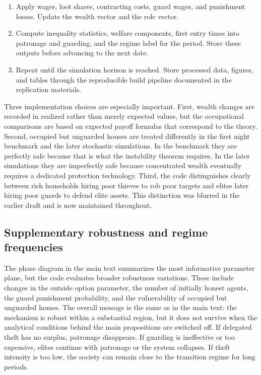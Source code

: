\begin{enumerate}[leftmargin=1.5em]
    \item Apply wages, loot shares, contracting costs, guard wages, and punishment losses. Update the wealth vector and the role vector.
    \item Compute inequality statistics, welfare components, first entry times into patronage and guarding, and the regime label for the period. Store these outputs before advancing to the next date.
    \item Repeat until the simulation horizon is reached. Store processed data, figures, and tables through the reproducible build pipeline documented in the replication materials.
\end{enumerate}

Three implementation choices are especially important. First, wealth changes are recorded in realized rather than merely expected values, but the occupational comparisons are based on expected payoff formulas that correspond to the theory. Second, occupied but unguarded houses are treated differently in the first night benchmark and the later stochastic simulations. In the benchmark they are perfectly safe because that is what the instability theorem requires. In the later simulations they are imperfectly safe because concentrated wealth eventually requires a dedicated protection technology. Third, the code distinguishes clearly between rich households hiring poor thieves to rob poor targets and elites later hiring poor guards to defend elite assets. This distinction was blurred in the earlier draft and is now maintained throughout.

\subsection{Supplementary robustness and regime frequencies}

The phase diagram in the main text summarizes the most informative parameter plane, but the code evaluates broader robustness variations. These include changes in the outside option parameter, the number of initially honest agents, the guard punishment probability, and the vulnerability of occupied but unguarded homes. The overall message is the same as in the main text: the mechanism is robust within a substantial region, but it does not survive when the analytical conditions behind the main propositions are switched off. If delegated theft has no surplus, patronage disappears. If guarding is ineffective or too expensive, elites continue with patronage or the system collapses. If theft intensity is too low, the society can remain close to the transition regime for long periods.

